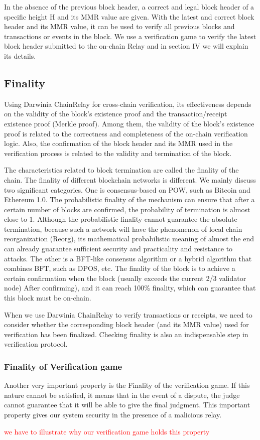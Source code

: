 In the absence of the previous block header, a correct and legal block header of a specific height H and its MMR value are given. With the latest and correct block header and its MMR value, it can be used to verify all previous blocks and transactions or events in the block. We use a verification game to verify the latest block header submitted to the on-chain Relay and in section IV we will explain its details.

\subsection*{Finality}
Using Darwinia ChainRelay for cross-chain verification, its effectiveness depends on the validity of the block’s existence proof and the transaction/receipt existence proof (Merkle proof). Among them, the validity of the block’s existence proof is related to the correctness and completeness of the on-chain verification logic. Also, the confirmation of the block header and its MMR used in the verification process is related to the validity and termination of the block.

The characteristics related to block termination are called the finality of the chain. The finality of different blockchain networks is different. We mainly discuss two significant categories. One is consensus-based on POW, such as Bitcoin and Ethereum 1.0. The probabilistic finality of the mechanism can ensure that after a certain number of blocks are confirmed, the probability of termination is almost close to 1. Although the probabilistic finality cannot guarantee the absolute termination, because such a network will have the phenomenon of local chain reorganization (Reorg), its mathematical probabilistic meaning of almost the end can already guarantee sufficient security and practicality and resistance to attacks. The other is a BFT-like consensus algorithm or a hybrid algorithm that combines BFT, such as DPOS, etc. The finality of the block is to achieve a certain confirmation when the block (usually exceeds the current 2/3 validator node) After confirming), and it can reach 100\% finality, which can guarantee that this block must be on-chain.

When we use Darwinia ChainRelay to verify transactions or receipts, we need to consider whether the corresponding block header (and its MMR value) used for verification has been finalized. Checking finality is also an indispensable step in verification protocol.

\subsubsection*{Finality of Verification game}

Another very important property is the Finality of the verification game. If this nature cannot be satisfied, it means that in the event of a dispute, the judge cannot guarantee that it will be able to give the final judgment. This important property gives our system security in the presence of a malicious relay.

\textcolor{red} { we have to illustrate why our verification game holds this property}
